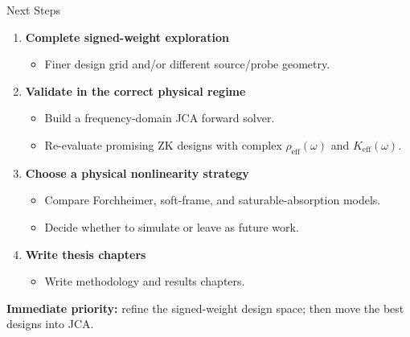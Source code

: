 \documentclass[aspectratio=169,11pt]{beamer}
\begin{document}
\begin{frame}{Next Steps}
  \begin{enumerate}
    \item \textbf{Complete signed-weight exploration}
      \begin{itemize}
        \item Finer design grid and/or different source/probe geometry.
      \end{itemize}
    \item \textbf{Validate in the correct physical regime}
      \begin{itemize}
        \item Build a frequency-domain JCA forward solver.
        \item Re-evaluate promising ZK designs with complex $\rho_\text{eff}(\omega)$ and $K_\text{eff}(\omega)$.
      \end{itemize}
    \item \textbf{Choose a physical nonlinearity strategy}
      \begin{itemize}
        \item Compare Forchheimer, soft-frame, and saturable-absorption models.
        \item Decide whether to simulate or leave as future work.
      \end{itemize}
    \item \textbf{Write thesis chapters}
      \begin{itemize}
        \item Write methodology and results chapters.
      \end{itemize}
  \end{enumerate}

  \vspace{0.3cm}
  \textcolor{gdpDarkBlue}{\textbf{Immediate priority:} refine the signed-weight design space; then move the best designs into JCA.}
\end{frame}
\end{document}
